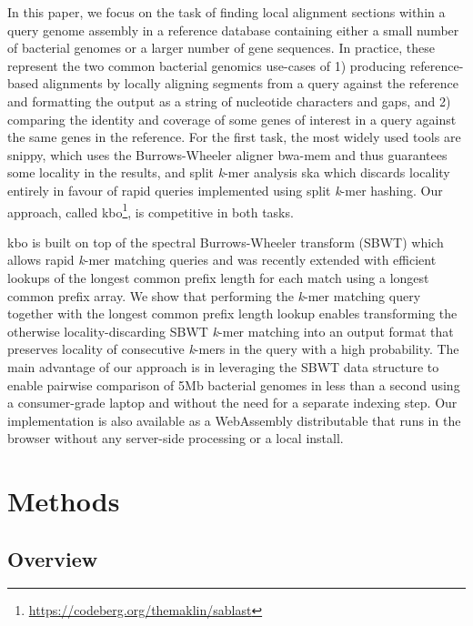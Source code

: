 \documentclass[unnumsec,webpdf,contemporary,large]{oup-authoring-template}%
\theoremstyle{thmstyleone}%
\theoremstyle{thmstyletwo}%
\theoremstyle{thmstylethree}%
\begin{document}
In this paper, we focus on the task of finding local alignment sections within a query genome assembly in a reference database containing either a small number of bacterial genomes or a larger number of gene sequences. In practice, these represent the two common bacterial genomics use-cases of 1) producing reference-based alignments by locally aligning segments from a query against the reference and formatting the output as a string of nucleotide characters and gaps, and 2) comparing the identity and coverage of some genes of interest in a query against the same genes in the reference. For the first task, the most widely used tools are snippy\cite{seemann2015snippy}, which uses the Burrows-Wheeler aligner bwa-mem \cite{li2013aligning} and thus guarantees some locality in the results, and split \emph{k}-mer analysis ska \cite{derelle2024seamless, harris2018ska} which discards locality entirely in favour of rapid queries implemented using split \emph{k}-mer hashing. Our approach, called kbo\footnote{\url{https://codeberg.org/themaklin/sablast}}, is competitive in both tasks.

kbo is built on top of the spectral Burrows-Wheeler transform (SBWT) which allows rapid \emph{k}-mer matching queries\cite{alanko2023small} and was recently extended with efficient lookups of the longest common prefix length for each match\cite{alanko2024finimizers} using a longest common prefix array\cite{alanko2023longest}. We show that performing the \emph{k}-mer matching query together with the longest common prefix length lookup enables transforming the otherwise locality-discarding SBWT \emph{k}-mer matching into an output format that preserves locality of consecutive \emph{k}-mers in the query with a high probability. The main advantage of our approach is in leveraging the SBWT data structure to enable pairwise comparison of 5Mb bacterial genomes in less than a second using a consumer-grade laptop and without the need for a separate indexing step. Our implementation is also available as a WebAssembly distributable that runs in the browser without any server-side processing or a local install.

\section{Methods}\label{methods}
\subsection{Overview}
\end{document}

